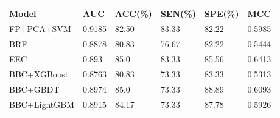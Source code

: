 \begin{tabular}{llllll}
\toprule
Model & AUC & ACC(\%) & SEN(\%) & SPE(\%) & MCC \\
\midrule
FP+PCA+SVM &    0.9185 & 82.50 & 83.33 & 82.22 &    0.5985 \\
BRF & 0.8878 & 80.83 & 76.67 & 82.22 & 0.5444 \\
EEC & 0.893 & 85.0 & 83.33 & 85.56 & 0.6413 \\
BBC+XGBoost & 0.8763 & 80.83 & 73.33 & 83.33 & 0.5313 \\
BBC+GBDT & 0.8974 & 85.0 & 73.33 & 88.89 & 0.6093 \\
BBC+LightGBM & 0.8915 & 84.17 & 73.33 & 87.78 & 0.5926 \\
\bottomrule
\end{tabular}
